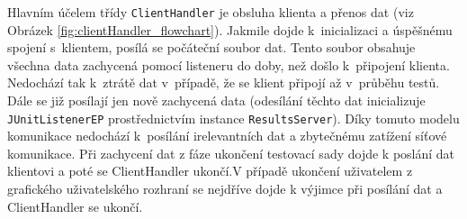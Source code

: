 	Hlavním účelem třídy \texttt{ClientHandler} je obsluha klienta a přenos dat (viz Obrázek \ref{fig:clientHandler_flowchart}). Jakmile dojde k~inicializaci a úspěšnému spojení s~klientem, posílá se počáteční soubor dat. Tento soubor obsahuje všechna data zachycená pomocí listeneru do doby, než došlo k~připojení klienta. Nedochází tak k~ztrátě dat v~případě, že se klient připojí až v~průběhu testů. Dále se již posílají jen nově zachycená data (odesílání těchto dat inicializuje \texttt{JUnitListenerEP} prostřednictvím instance \texttt{ResultsServer}). Díky tomuto modelu komunikace nedochází k~posílání irelevantních dat a zbytečnému zatížení síťové komunikace. Při zachycení dat z fáze ukončení testovací sady dojde k poslání dat klientovi a poté se ClientHandler ukončí.V případě ukončení uživatelem z grafického uživatelského rozhraní se nejdříve dojde k výjimce při posílání dat a ClientHandler se ukončí.

